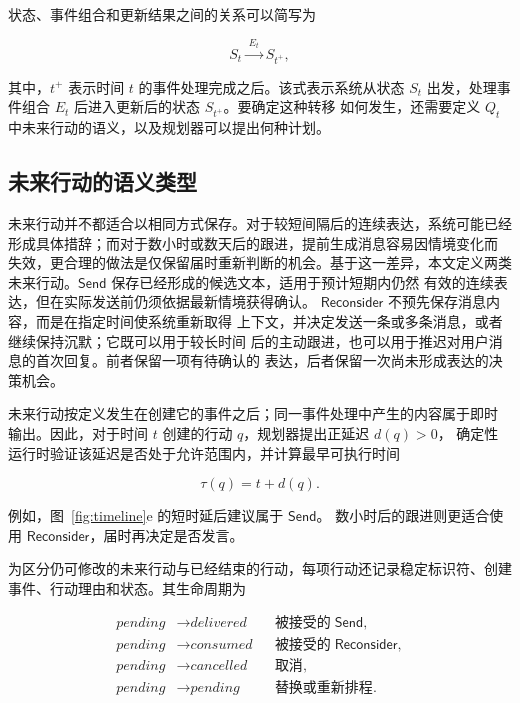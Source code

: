 \documentclass[manuscript,nonacm]{acmart}
\begin{document}
状态、事件组合和更新结果之间的关系可以简写为

\begin{equation}
S_t \xrightarrow{\;E_t\;} S_{t^+},
\end{equation}

其中，$t^+$ 表示时间 $t$ 的事件处理完成之后。该式表示系统从状态 $S_t$
出发，处理事件组合 $E_t$ 后进入更新后的状态 $S_{t^+}$。要确定这种转移
如何发生，还需要定义 $Q_t$ 中未来行动的语义，以及规划器可以提出何种计划。

\subsection{未来行动的语义类型}

未来行动并不都适合以相同方式保存。对于较短间隔后的连续表达，系统可能已经
形成具体措辞；而对于数小时或数天后的跟进，提前生成消息容易因情境变化而
失效，更合理的做法是仅保留届时重新判断的机会。基于这一差异，本文定义两类
未来行动。$\mathsf{Send}$ 保存已经形成的候选文本，适用于预计短期内仍然
有效的连续表达，但在实际发送前仍须依据最新情境获得确认。
$\mathsf{Reconsider}$ 不预先保存消息内容，而是在指定时间使系统重新取得
上下文，并决定发送一条或多条消息，或者继续保持沉默；它既可以用于较长时间
后的主动跟进，也可以用于推迟对用户消息的首次回复。前者保留一项有待确认的
表达，后者保留一次尚未形成表达的决策机会。

未来行动按定义发生在创建它的事件之后；同一事件处理中产生的内容属于即时
输出。因此，对于时间 $t$ 创建的行动 $q$，规划器提出正延迟 $d(q)>0$，
确定性运行时验证该延迟是否处于允许范围内，并计算最早可执行时间

\begin{equation}
\tau(q)=t+d(q).
\end{equation}

例如，图~\ref{fig:timeline}e 的短时延后建议属于 $\mathsf{Send}$。
数小时后的跟进则更适合使用 $\mathsf{Reconsider}$，届时再决定是否发言。

为区分仍可修改的未来行动与已经结束的行动，每项行动还记录稳定标识符、创建
事件、行动理由和状态。其生命周期为

\begin{equation}
\begin{aligned}
\textit{pending} &\rightarrow \textit{delivered} &&
  \text{被接受的}\;\mathsf{Send},\\
\textit{pending} &\rightarrow \textit{consumed} &&
  \text{被接受的}\;\mathsf{Reconsider},\\
\textit{pending} &\rightarrow \textit{cancelled} && \text{取消},\\
\textit{pending} &\rightarrow \textit{pending} && \text{替换或重新排程}.
\end{aligned}
\end{equation}
\end{document}
